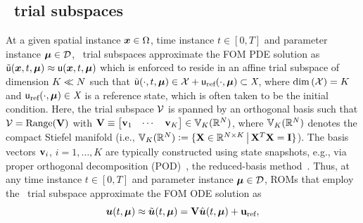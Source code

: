 \documentclass[3p,computermodern,10pt]{elsarticle}
\begin{document}
\subsection{\spatialAcronym\ trial subspaces}
At a given spatial instance $\boldsymbol x \in \Omega$, time instance 
$t\in[0,T]$ and parameter instance $\boldsymbol \mu \in \mathcal{D}$,
\spatialAcronym\ trial subspaces approximate the FOM PDE solution
as $\tilde{\mathsf{u}}(\boldsymbol x, t,\boldsymbol \mu) \approx \mathsf{u}(\boldsymbol x, t,\boldsymbol \mu)$ which is enforced to reside in an affine 
trial subspace of dimension $K\ll N$ such that 
$\tilde{\mathsf{u}}(\cdot,t,\boldsymbol \mu) \in \mathcal{X} + \mathsf{u}_{\text{ref}}(\cdot,\boldsymbol \mu) \subset \textit{X}$, where $\dim{(\mathcal{X})} = K$ and 
$\mathsf{u}_{\text{ref}}(\cdot,\boldsymbol \mu) \in \textit{X}$ is a reference state, which is often taken to be the initial condition. 
Here, the trial subspace
$\mathcal{V}$ 
is spanned by an orthogonal basis such that
$ \mathcal{V}= \text{Range}(\mathbf{V})$
with 
$ \mathbf{V} \equiv \begin{bmatrix}  \mathbf{v}_1  & \cdots &  \mathbf{v}_K \end{bmatrix}
	\in \mathbb{V}_{K}(\mathbb{R}^{N})$, where $\mathbb{V}_{K}(\mathbb{R}^{N})$ denotes the compact Stiefel manifold (i.e.,  $
	\mathbb{V}_{K}(\mathbb{R}^{N})\vcentcolon=
	\{ \mathbf{X} \in \mathbb{R}^{N
	\times K}\, \big|\, \mathbf{X}^T \mathbf{X} = \mathbf{I} \}$).
The basis vectors $\mathbf{v}_i$, $i=1,\ldots,K$ are typically constructed
using state snapshots, e.g., via
proper orthogonal decomposition (POD)~\cite{berkooz_turbulence_pod}, the reduced-basis method~\cite{rb_1,rb_2,rb_3,NgocCuong2005,Rozza2008}. 
Thus, at any time instance $t\in[0,T]$ and parameter instance $\boldsymbol \mu \in \mathcal{D}$, ROMs that employ the  \spatialAcronym\
trial subspace approximate the FOM ODE solution as
\begin{equation}\label{eq:affine_trialspace}
\boldsymbol u(t,\boldsymbol \mu)  \approx \tilde{\boldsymbol u}(t,\boldsymbol \mu) = \mathbf{V}  \hat{\boldsymbol u}(t,\boldsymbol \mu) + \mathbf{u}_{\text{ref}},
\end{equation}
\end{document}
